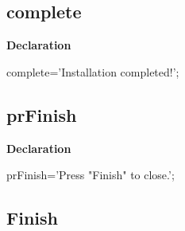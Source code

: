 \documentclass{report}
\newif\ifpdf
\begin{document}
\subsection*{complete}
\fi
\label{trstrings-complete}
\begin{list}{}{
\setlength{\itemindent}{0cm}
\setlength{\listparindent}{0cm}
\setlength{\leftmargin}{\evensidemargin}
\addtolength{\leftmargin}{\tmplength}
\settowidth{\labelsep}{X}
\addtolength{\leftmargin}{\labelsep}
\setlength{\labelwidth}{\tmplength}
}
\item[\textbf{Declaration}\hfill]
\ifpdf
\begin{flushleft}
\fi
\begin{ttfamily}
complete='Installation completed!';\end{ttfamily}

\ifpdf
\end{flushleft}
\fi

\end{list}
\ifpdf
\subsection*{\large{\textbf{prFinish}}\normalsize\hspace{1ex}\hrulefill}
\else
\subsection*{prFinish}
\fi
\label{trstrings-prFinish}
\begin{list}{}{
\setlength{\itemindent}{0cm}
\setlength{\listparindent}{0cm}
\setlength{\leftmargin}{\evensidemargin}
\addtolength{\leftmargin}{\tmplength}
\settowidth{\labelsep}{X}
\addtolength{\leftmargin}{\labelsep}
\setlength{\labelwidth}{\tmplength}
}
\item[\textbf{Declaration}\hfill]
\ifpdf
\begin{flushleft}
\fi
\begin{ttfamily}
prFinish='Press "Finish" to close.';\end{ttfamily}

\ifpdf
\end{flushleft}
\fi

\end{list}
\ifpdf
\subsection*{\large{\textbf{Finish}}\normalsize\hspace{1ex}\hrulefill}
\else
\end{document}
